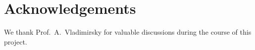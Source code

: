 \documentclass[eikonal.tex]{subfiles}
\begin{document}
\section{Acknowledgements}

We thank Prof.\ A.\ Vladimirsky for valuable discussions during the
course of this project.
\end{document}
